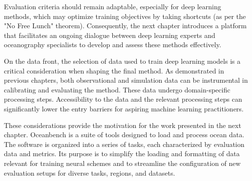 \begin{bibunit}
Evaluation criteria should remain adaptable, especially for deep learning methods, which may optimize training objectives by taking shortcuts (as per the "No Free Lunch" theorem). Consequently, the next chapter introduces a platform that facilitates an ongoing dialogue between deep learning experts and oceanography specialists to develop and assess these methods effectively.

On the data front, the selection of data used to train deep learning models is a critical consideration when shaping the final method. As demonstrated in previous chapters, both observational and simulation data can be instrumental in calibrating and evaluating the method. These data undergo domain-specific processing steps. Accessibility to the data and the relevant processing steps can significantly lower the entry barriers for aspiring machine learning practitioners.

These considerations provide the motivation for the work presented in the next chapter. Oceanbench is a suite of tools designed to load and process ocean data. The software is organized into a series of tasks, each characterized by evaluation data and metrics. Its purpose is to simplify the loading and formatting of data relevant for training neural schemes and to streamline the configuration of new evaluation setups for diverse tasks, regions, and datasets.







\newpage
% 
% 

% 
% 
% 




\end{bibunit}
